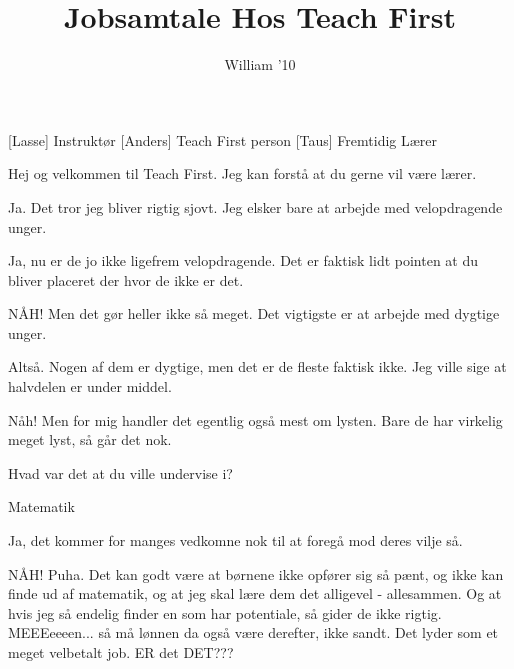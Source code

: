 \documentclass[a4paper,11pt]{article}
\title{Jobsamtale Hos Teach First}
\author{William '10}
\begin{document}
\maketitle

\begin{roles}
[Lasse] Instruktør
[Anders] Teach First person
[Taus] Fremtidig Lærer
\end{roles}

\begin{props}
\end{props}

\begin{sketch}

 Hej og velkommen til Teach First. Jeg kan forstå at du gerne vil være lærer.

 Ja. Det tror jeg bliver rigtig sjovt. Jeg elsker bare at arbejde med velopdragende unger.

 Ja, nu er de jo ikke ligefrem velopdragende. Det er faktisk lidt pointen at du bliver placeret der hvor de ikke er det.

 NÅH! Men det gør heller ikke så meget. Det vigtigste er at arbejde med dygtige unger.

 Altså. Nogen af dem er dygtige, men det er de fleste faktisk ikke. Jeg ville sige at halvdelen er under middel.

 Nåh! Men for mig handler det egentlig også mest om lysten. Bare de har virkelig meget lyst, så går det nok.

 Hvad var det at du ville undervise i?

 Matematik

 Ja, det kommer for manges vedkomne nok til at foregå mod deres vilje så.

 NÅH! Puha. Det kan godt være at børnene ikke opfører sig så pænt, og ikke kan finde ud af matematik, og at jeg skal lære dem det alligevel - allesammen. Og at hvis jeg så endelig finder en som har potentiale, så gider de ikke rigtig. MEEEeeeen... så må lønnen da også være derefter, ikke sandt. Det lyder som et meget velbetalt job. ER det DET???

\end{sketch}
\end{document}
